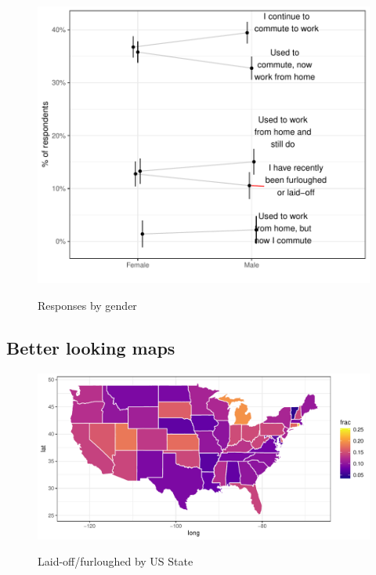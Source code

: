 \documentclass[12pt]{article}
\begin{document}
\begin{figure}
  \caption{Responses by gender} \label{fig:gender}
\centering
\begin{minipage}{1.0 \linewidth}
  \includegraphics[width = \linewidth]{plots/gender.pdf} \\
  \begin{footnotesize}
    \begin{singlespace}
    \end{singlespace}
    \end{footnotesize}
\end{minipage}
\end{figure} 

\subsection{Better looking maps} 

\begin{figure}
  \caption{Laid-off/furloughed by US State} \label{fig:gender}
\centering
\begin{minipage}{1.0 \linewidth}
  \includegraphics[width = \linewidth]{plots/geo_laidoff.pdf} \\
  \begin{footnotesize}
    \end{footnotesize}
\end{minipage}
\end{figure} 
\end{document}

